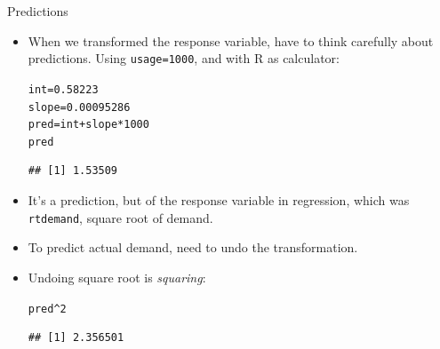 \documentclass[unknownkeysallowed]{beamer}\usepackage[]{graphicx}\usepackage[]{color}
\makeatletter
\newcommand{\hlnum}[1]{\textcolor[rgb]{0.686,0.059,0.569}{#1}}%
\newcommand{\hlopt}[1]{\textcolor[rgb]{0,0,0}{#1}}%
\newcommand{\hlstd}[1]{\textcolor[rgb]{0.345,0.345,0.345}{#1}}%
\newcommand{\hlkwb}[1]{\textcolor[rgb]{0.69,0.353,0.396}{#1}}%
\newenvironment{kframe}{%
 \def\at@end@of@kframe{}%
 \ifinner\ifhmode%
  \def\at@end@of@kframe{\end{minipage}}%
  \begin{minipage}{\columnwidth}%
 \fi\fi%
 \def\FrameCommand##1{\hskip\@totalleftmargin \hskip-\fboxsep
 \colorbox{shadecolor}{##1}\hskip-\fboxsep
     \hskip-\linewidth \hskip-\@totalleftmargin \hskip\columnwidth}%
 \MakeFramed {\advance\hsize-\width
   \@totalleftmargin\z@ \linewidth\hsize
   \@setminipage}}%
 {\par\unskip\endMakeFramed%
 \at@end@of@kframe}
\newenvironment{knitrout}{}{} %
\makeatother
\begin{document}
\begin{frame}[fragile]{Predictions}

  \begin{itemize}
  \item When we transformed the response variable, have to think
    carefully about predictions. Using \texttt{usage=1000}, and with R
    as calculator:
    
\begin{knitrout}
\color{fgcolor}\begin{kframe}
\begin{alltt}
\hlstd{int}\hlkwb{=}\hlnum{0.58223}
\hlstd{slope}\hlkwb{=}\hlnum{0.00095286}
\hlstd{pred}\hlkwb{=}\hlstd{int}\hlopt{+}\hlstd{slope}\hlopt{*}\hlnum{1000}
\hlstd{pred}
\end{alltt}
\begin{verbatim}
## [1] 1.53509
\end{verbatim}
\end{kframe}
\end{knitrout}
\item It's a prediction, but of the response variable in regression,
  which was \texttt{rtdemand}, square root of demand.
\item To predict actual demand, need to undo the transformation.
\item Undoing square root is \emph{squaring}:
\begin{knitrout}
\color{fgcolor}\begin{kframe}
\begin{alltt}
\hlstd{pred}\hlopt{^}\hlnum{2}
\end{alltt}
\begin{verbatim}
## [1] 2.356501
\end{verbatim}
\end{kframe}
\end{knitrout}

  \end{itemize}
  
\end{frame}
\end{document}
